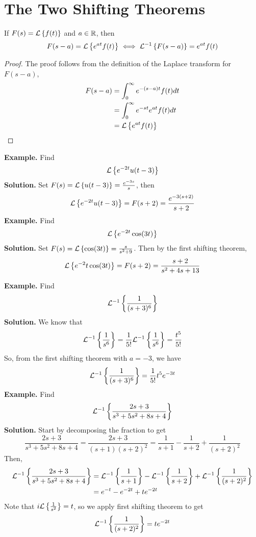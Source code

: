 \documentclass[openany]{report}
\begin{document}
\section{The Two Shifting Theorems}
\begin{theorem}
    If $F(s) = \mathcal{L}\left\{f(t)\right\}$ and $a \in \mathbb{R}$, then 
    \[F(s-a) = \mathcal{L}\left\{e^{at}f(t)\right\} \iff \mathcal{L}^{-1}\left\{F(s-a)\right\} = e^{at}f(t)\]
\end{theorem}
\begin{proof}
    The proof follows from the definition of the Laplace transform for $F(s-a)$, 
    \begin{align*}
        F(s-a) &= \int_0^\infty e^{-(s-a)t}f(t)dt\\
        &= \int_0^\infty e^{-st}e^{at}f(t)dt\\
        &= \mathcal{L}\left\{e^{at}f(t)\right\}
    \end{align*}
\end{proof}
\noindent
\textbf{Example.} Find 
\[\mathcal{L}\left\{e^{-2t}u(t-3)\right\}\]
\textbf{Solution.} Set $F(s) = \mathcal{L}\left\{u(t-3)\right\} = \frac{e^{-3s}}{s}$, then 
\[\mathcal{L}\left\{e^{-2t}u(t-3)\right\} = F(s+2) = \frac{e^{-3(s+2)}}{s+2}\]
\noindent
\textbf{Example.} Find 
\[\mathcal{L}\left\{e^{-2t}\cos(3t)\right\}\]
\textbf{Solution.} Set $F(s) = \mathcal{L}\left\{\cos(3t)\right\} = \frac{s}{s^2 + 9}$. Then by the first shifting theorem, 
\[\mathcal{L}\left\{e^{-2}t\cos(3t)\right\} = F(s + 2) = \frac{s+2}{s^2+4s+13}\] 

\noindent
\textbf{Example.} Find 
\[\mathcal{L}^{-1}\left\{\frac{1}{(s+3)^6}\right\}\]
\textbf{Solution.} We know that 
\[\mathcal{L}^{-1}\left\{\frac{1}{s^6}\right\} = \frac{1}{5!} \mathcal{L}^{-1}\left\{\frac{1}{s^6}\right\} = \frac{t^5}{5!}\]
So, from the first shifting theorem with $a = -3$, we have 
\[\mathcal{L}^{-1}\left\{\frac{1}{(s+3)^6}\right\} = \frac{1}{5!}t^5e^{-3t}\]
\noindent
\textbf{Example.} Find 
\[\mathcal{L}^{-1}\left\{\frac{2s+3}{s^3 + 5s^2 + 8s + 4}\right\}\]
\textbf{Solution.} Start by decomposing the fraction to get 
\[\frac{2s+3}{s^3+5s^2+8s + 4} = \frac{2s+3}{(s+1)(s+2)^2} = \frac{1}{s+1} - \frac{1}{s+2}  + \frac{1}{(s+2)^2}\]
Then, 
\begin{align*}
    \mathcal{L}^{-1}\left\{\frac{2s+3}{s^3+5s^2 + 8s+ 4}\right\} &= \mathcal{L}^{-1}\left\{\frac{1}{s+1}\right\} - \mathcal{L}^{-1}\left\{\frac{1}{s+2}\right\} + \mathcal{L}^{-1}\left\{\frac{1}{(s+2)^2}\right\}\\
    &= e^{-t} - e^{-2t} + te^{-2t}
\end{align*}
Note that $i\mathcal{L}\left\{\frac{1}{s^2}\right\} = t$, so we apply first shifting theorem to get 
\[\mathcal{L}^{-1}\left\{\frac{1}{(s+2)^2}\right\} = te^{-2t}\]
\end{document}
